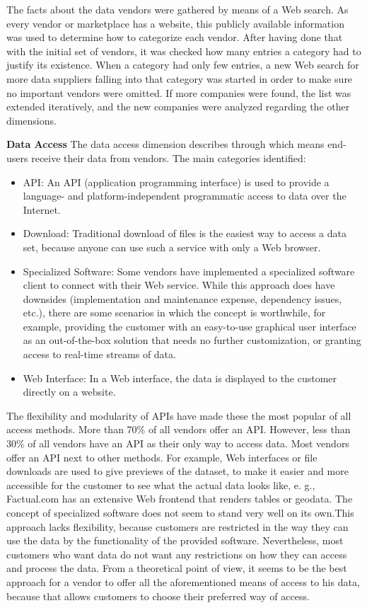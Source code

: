 	The facts about the data vendors were gathered by means of a Web search. As every vendor or marketplace has a website, this publicly available information was used to determine how to categorize each vendor. After having done that with the initial set of vendors, it was checked how many entries a category had to justify its existence. When a category had only few entries, a new Web search for more data suppliers falling into that category was started in order to make sure no important vendors were omitted. If more companies were found, the list was extended iteratively, and the new companies were analyzed regarding the other dimensions.

	\textbf{Data Access}
	The data access dimension describes through which means end-users receive their data from vendors. The main categories identified: 
	\begin{itemize}
	\item API: An API (application programming interface) is used to provide a language- and platform-independent programmatic access to data over the Internet.
	\item Download: Traditional download of files is the easiest way to access a data set, because anyone can use such a service with only a Web browser. 
	\item Specialized Software: Some vendors have implemented a specialized software client to connect with their Web service. While this approach does have downsides (implementation and maintenance expense, dependency issues, etc.), there are some scenarios in which the concept is worthwhile, for example, providing the customer with an easy-to-use graphical user interface as an out-of-the-box solution that needs no further customization, or granting access to real-time streams of data. 
	\item Web Interface: In a Web interface, the data is displayed to the customer directly on a website. 
	\end{itemize}

	The flexibility and modularity of APIs have made these the most popular of all access methods. More than 70\% of all vendors offer an API. However, less than 30\% of all vendors have an API as their only way to access data. Most vendors offer an API next to other methods. For example, Web interfaces or file downloads are used to give previews of the dataset, to make it easier and more accessible for the customer to see what the actual data looks like, e. g., Factual.com has an extensive Web frontend that renders tables or geodata. The concept of specialized software does not seem to stand very well on its own.This approach lacks flexibility, because customers are restricted in the way they can use the data by the functionality of the provided software. Nevertheless, most customers who want data do not want any restrictions on how they can access and process the data. From a theoretical point of view, it seems to be the best approach for a vendor to offer all the aforementioned means of access to his data, because that allows customers to choose their preferred way of access. 

